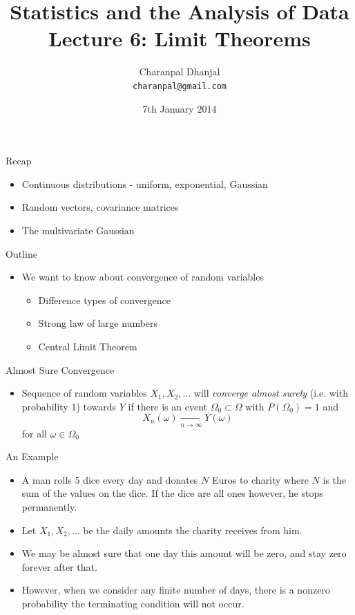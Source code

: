 \documentclass{beamer}
\title{Statistics and the Analysis of Data\\ Lecture 6: Limit Theorems}
\author{Charanpal Dhanjal \\ \texttt{charanpal@gmail.com}}
\institute{\'{E}cole des Ponts}
\date{7th January 2014}
\begin{document}
\frame{\titlepage}


\begin{frame}{Recap}  
\begin{itemize} 
\item Continuous distributions - uniform, exponential, Gaussian 
\item Random vectors, covariance matrices 
\item The multivariate Gaussian 
\end{itemize}
\end{frame}

\begin{frame}{Outline}  
\begin{itemize} 
 \item We want to know about convergence of random variables 
\begin{itemize}
\item Difference types of convergence 
\item Strong law of large numbers 
\item Central Limit Theorem 
\end{itemize}
\end{itemize}
\end{frame}

\begin{frame}{Almost Sure Convergence}  
\begin{itemize}
 \item Sequence of random variables $X_1, X_2, \ldots$ will \emph{converge almost surely} (i.e. with probability 1) towards $Y$ if there is an event $\Omega_0 \subset \Omega$ with $P(\Omega_0) = 1$ and 
\begin{displaymath}
X_n(\omega) \xrightarrow[n \rightarrow \infty]{} Y(\omega) 
\end{displaymath}
 for all $\omega \in \Omega_0$
\end{itemize}
\end{frame}

\begin{frame}{An Example} 
\begin{itemize}
 \item A man rolls 5 dice every day and donates $N$ Euros to charity where $N$ is the sum of the values on the dice. If the dice are all ones however, he stops permanently.  
 \item Let $X_1, X_2, \ldots$ be the daily amounts the charity receives from him.
 \item We may be almost sure that one day this amount will be zero, and stay zero forever after that.
 \item However, when we consider any finite number of days, there is a nonzero probability the terminating condition will not occur. 
\end{itemize}
\end{frame}
\end{document}
